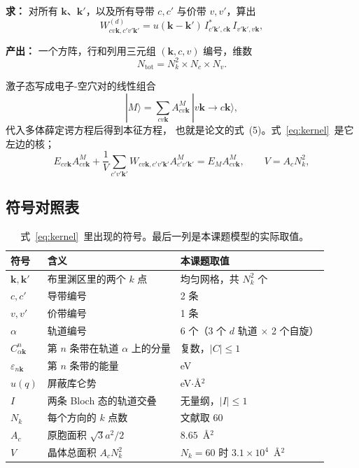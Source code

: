 \documentclass[11pt,a4paper]{ctexart}
\newcommand{\kk}{\mathbf{k}}
\newcommand{\kq}{\mathbf{k}'}
\newcommand{\eps}{\varepsilon}
\begin{document}
\textbf{求：}
对所有 $\kk$、$\kq$，以及所有导带 $c,c'$ 与价带 $v,v'$，算出
\begin{equation}
W^{(d)}_{cv\kk,c'v'\kq}=u(\kk-\kq)\,I^{*}_{c'\kq,c\kk}\,I_{v'\kq,v\kk},
\label{eq:kernel}
\end{equation}

\textbf{产出：}
一个方阵，行和列用三元组 $(\kk,c,v)$ 编号，维数
\begin{equation*}
N_{\mathrm{tot}}=N_k^2\times N_c\times N_v .
\end{equation*}

激子态写成电子-空穴对的线性组合
\begin{equation}
|M\rangle=\sum_{cv\kk}A^{M}_{cv\kk}\,|v\kk\to c\kk\rangle ,
\label{eq:basis}
\end{equation}
代入多体薛定谔方程后得到本征方程，
也就是论文的式~(5)。式~\eqref{eq:kernel}~是它左边的核；
\begin{equation}
E_{cv\kk}A^{M}_{cv\kk}
+\frac{1}{V}\sum_{c'v'\kq}W_{cv\kk,c'v'\kq}A^{M}_{c'v'\kq}
=E_{M}A^{M}_{cv\kk},
\qquad V=A_cN_k^2 ,
\label{eq:bse}
\end{equation}

\subsection{符号对照表}

\begin{table}[htbp]
\centering
\caption{式~\eqref{eq:kernel}~里出现的符号。最后一列是本课题模型的实际取值。}
\label{tab:symbols}
\begin{tabular}{@{}lll@{}}
\toprule
符号 & 含义 & 本课题取值\\
\midrule
$\kk,\kq$ & 布里渊区里的两个 $k$ 点 & 均匀网格，共 $N_k^2$ 个\\
$c,c'$ & 导带编号 & 2 条\\
$v,v'$ & 价带编号 & 1 条\\
$\alpha$ & 轨道编号 & 6 个（3 个 $d$ 轨道 $\times$ 2 个自旋）\\
$C^{n}_{\alpha\kk}$ & 第 $n$ 条带在轨道 $\alpha$ 上的分量 & 复数，$|C|\le1$\\
$\eps_{n\kk}$ & 第 $n$ 条带的能量 & eV\\
$u(q)$ & 屏蔽库仑势 & eV$\cdot$\AA$^2$\\
$I$ & 两条 Bloch 态的轨道交叠 & 无量纲，$|I|\le1$\\
$N_k$ & 每个方向的 $k$ 点数 & 文献取 60\\
$A_c$ & 原胞面积 $\sqrt3a^2/2$ & $8.65$~\AA$^2$\\
$V$ & 晶体总面积 $A_cN_k^2$ & $N_k=60$ 时 $3.1\times10^4$~\AA$^2$\\
\bottomrule
\end{tabular}
\end{table}
\end{document}
